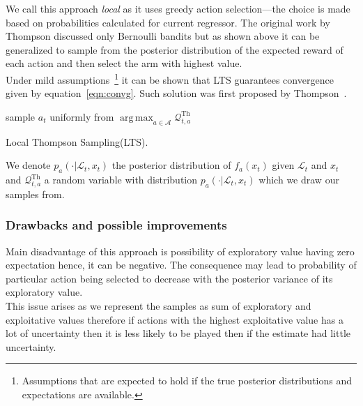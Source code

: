 \documentclass[12pt, a4paper, pdflatex, leqno]{report}
\begin{document}
We call this approach \emph{local} as it uses greedy action selection---the choice is made based on probabilities calculated for current regressor. The original work by Thompson discussed only Bernoulli bandits but as shown above it can be generalized to sample from the posterior distribution of the expected reward of each action and then select the arm with highest value.\\

Under mild assumptions~\footnote{Assumptions that are expected to hold if the true posterior distributions and expectations are available.} it can be shown that LTS guarantees convergence given by equation~\ref{eqn:convg}. Such solution was first proposed by Thompson~\citep{thompson:biom33}.\\


\vspace{2cm}
\begin{algorithm}[H]
  sample $a_t$ uniformly from $\operatorname{arg\,max}_{a \in \mathscr{A}} \mathscr{Q}^\text{Th}_{t,a}$ \;
 \caption{Local Thompson Sampling(LTS).\label{al:LTS}}
\end{algorithm}
\vspace{2cm}

We denote $p_a(\cdot | \mathscr{L}_t, x_t)$ the posterior distribution of $f_a(x_t)$ given $\mathscr{L}_t$ and $x_t$ and $\mathscr{Q}^\text{Th}_{t,a}$ a random variable with distribution $p_a(\cdot | \mathscr{L}_t, x_t)$ which we draw our samples from.\\


\subsubsection{Drawbacks and possible improvements}
Main disadvantage of this approach is possibility of exploratory value having zero expectation hence, it can be negative. The consequence may lead to probability of particular action being selected to decrease with the posterior variance of its exploratory value.\\
This issue arises as we represent the samples as sum of exploratory and exploitative values therefore if actions with the highest exploitative value has a lot of uncertainty then it is less likely to be played then if the estimate had little uncertainty.\\
\end{document}

